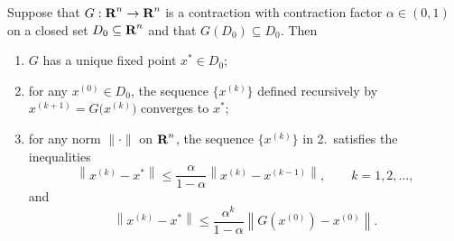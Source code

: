 \documentclass{homework}
\newcommand{\pow}[1]{^{\left(#1\right)}}
\newcommand{\norm}[1]{\left\lVert{#1}\right\rVert}
\begin{document}
	\maketitle
	
	\question Suppose that $G : \textbf{R}^n \to \textbf{R}^n$ is a contraction with contraction factor $\alpha \in (0,1)$ on a closed set $D_0 \subseteq \textbf{R}^n$ and that $G(D_0) \subseteq D_0$. Then
	\begin{enumerate}
		\item $G$ has a unique fixed point $x^* \in D_0$;
		\item for any $x\pow{0} \in D_0$, the sequence $\big\{x\pow{k}\big\}$ defined recursively by $x\pow{k+1} = G\big(x\pow{k}\big)$ converges to $x^*$;
		\item for any norm $\lVert \cdot\rVert$ on $\textbf{R}^n$, the sequence $\big\{x\pow{k}\big\}$ in 2.\ satisfies the inequalities
		\begin{equation}
			\label{eq:p1:a_posteriori_error}
			\norm{x\pow{k} - x^*} \le \frac{\alpha}{1-\alpha} \norm{x\pow{k} - x\pow{k-1}}, \qquad k =1,2,\dots,
		\end{equation}
		and
		\begin{equation}
			\label{eq:p1:convergence}
			\norm{x\pow{k} - x^*} \le \frac{\alpha^k}{1-\alpha}\norm{G\left(x\pow{0}\right) - x\pow{0}}.
		\end{equation}
	\end{enumerate}
	
\end{document}
